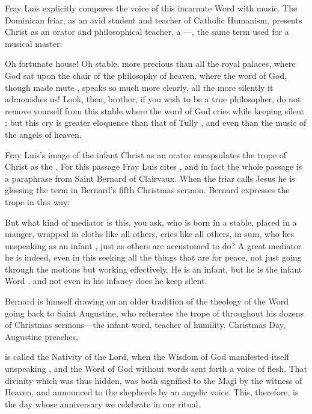 Fray Luis explicitly compares the voice of this incarnate Word with music.
The Dominican friar, as an avid student and teacher of Catholic Humanism,
presents Christ as an orator and philosophical teacher, a ---, the same term used for a musical master:
\begin{quoting}
    Oh fortunate house!
    Oh stable, more precious than all the royal palaces, where God sat upon the
    chair  of the philosophy of heaven, where the word of God,
    though made mute , speaks so much
    more clearly, all the more silently it admonishes us!
    Look, then, brother, if you wish to be a true philosopher, do not remove
    yourself from this stable where the word of God cries while keeping silent
    ;
    but this cry is greater eloquence than that of Tully , and even
    than the music of the angels of heaven.%
        \Autocite[39]{LuisdeGranada:Xmas}
\end{quoting}
Fray Luis's image of the infant Christ as an orator encapsulates the trope of
Christ as the .
For this passage Fray Luis cites , and in fact the whole
passage is a paraphrase from Saint Bernard of Clairvaux.
When the friar calls Jesus  he is
glossing the term  in Bernard's fifth Christmas sermon.
Bernard expresses the trope in this way:
\begin{quoting}
    But what kind of mediator is this, you ask, who is born in a stable, placed
    in a manger, wrapped in cloths like all others, cries like all others, in
    sum, who lies unspeaking as an infant , just as others
    are accustomed to do?
    A great mediator he is indeed, even in this seeking all the things that are
    for peace, not just going through the motions but working effectively.  He
    is an infant, but he is the infant Word , and not
    even in his infancy does he keep silent.%
        \Autocite[128A, Sermo V]{Bernard:Nativitate}
\end{quoting}
Bernard is himself drawing on an older tradition of the theology of the Word
going back to Saint Augustine, who reiterates the trope of  throughout his dozens of Christmas sermons---the
infant word, teacher of humility.%
    \Autocite[1004, heading for sermon 187]{Augustine:SermonesPL}
Christmas Day, Augustine preaches,
\begin{quoting}
    is called the Nativity of the Lord, when the Wisdom of God manifested
    itself unspeaking , and the Word of God without words
    sent forth a voice of flesh.
    That divinity which was thus hidden, was both signified to the Magi by the
    witness of Heaven, and announced to the shepherds by an angelic voice.
    This, therefore, is the day whose anniversary we celebrate in our ritual.%
        \Autocite[997, Sermo 185, In Natali Domini 2]{Augustine:SermonesPL}
\end{quoting}
